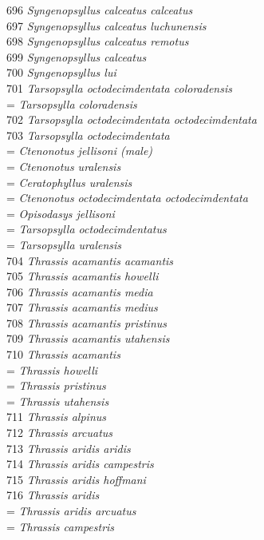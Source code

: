 \documentclass[
]{article}
\begin{document}
696 \emph{Syngenopsyllus calceatus calceatus}\\
697 \emph{Syngenopsyllus calceatus luchunensis}\\
698 \emph{Syngenopsyllus calceatus remotus}\\
699 \emph{Syngenopsyllus calceatus}\\
700 \emph{Syngenopsyllus lui}\\
701 \emph{Tarsopsylla octodecimdentata coloradensis}\\
= \emph{Tarsopsylla coloradensis}\\
702 \emph{Tarsopsylla octodecimdentata octodecimdentata}\\
703 \emph{Tarsopsylla octodecimdentata}\\
= \emph{Ctenonotus jellisoni (male)}\\
= \emph{Ctenonotus uralensis}\\
= \emph{Ceratophyllus uralensis}\\
= \emph{Ctenonotus octodecimdentata octodecimdentata}\\
= \emph{Opisodasys jellisoni}\\
= \emph{Tarsopsylla octodecimdentatus}\\
= \emph{Tarsopsylla uralensis}\\
704 \emph{Thrassis acamantis acamantis}\\
705 \emph{Thrassis acamantis howelli}\\
706 \emph{Thrassis acamantis media}\\
707 \emph{Thrassis acamantis medius}\\
708 \emph{Thrassis acamantis pristinus}\\
709 \emph{Thrassis acamantis utahensis}\\
710 \emph{Thrassis acamantis}\\
= \emph{Thrassis howelli}\\
= \emph{Thrassis pristinus}\\
= \emph{Thrassis utahensis}\\
711 \emph{Thrassis alpinus}\\
712 \emph{Thrassis arcuatus}\\
713 \emph{Thrassis aridis aridis}\\
714 \emph{Thrassis aridis campestris}\\
715 \emph{Thrassis aridis hoffmani}\\
716 \emph{Thrassis aridis}\\
= \emph{Thrassis aridis arcuatus}\\
= \emph{Thrassis campestris}\\
\end{document}
